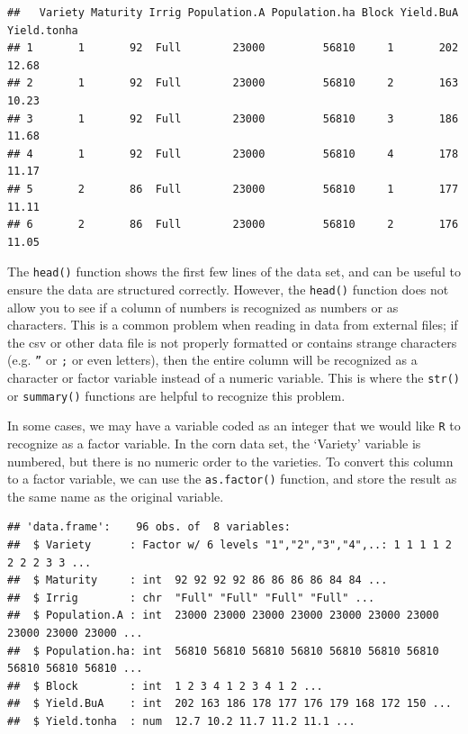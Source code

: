 \documentclass[letterpaper,]{book}
\newenvironment{Shaded}{\begin{snugshade}}{\end{snugshade}}
\newcommand{\KeywordTok}[1]{\textcolor[rgb]{0.13,0.29,0.53}{\textbf{#1}}}
\newcommand{\NormalTok}[1]{#1}
\newcommand{\OperatorTok}[1]{\textcolor[rgb]{0.81,0.36,0.00}{\textbf{#1}}}
\newcommand{\StringTok}[1]{\textcolor[rgb]{0.31,0.60,0.02}{#1}}
\begin{document}
\begin{verbatim}
##   Variety Maturity Irrig Population.A Population.ha Block Yield.BuA Yield.tonha
## 1       1       92  Full        23000         56810     1       202       12.68
## 2       1       92  Full        23000         56810     2       163       10.23
## 3       1       92  Full        23000         56810     3       186       11.68
## 4       1       92  Full        23000         56810     4       178       11.17
## 5       2       86  Full        23000         56810     1       177       11.11
## 6       2       86  Full        23000         56810     2       176       11.05
\end{verbatim}

The \texttt{head()} function shows the first few lines of the data set, and can be useful to ensure the data are structured correctly. However, the \texttt{head()} function does not allow you to see if a column of numbers is recognized as numbers or as characters. This is a common problem when reading in data from external files; if the csv or other data file is not properly formatted or contains strange characters (e.g. \texttt{”} or \texttt{;} or even letters), then the entire column will be recognized as a character or factor variable instead of a numeric variable. This is where the \texttt{str()} or \texttt{summary()} functions are helpful to recognize this problem.

In some cases, we may have a variable coded as an integer that we would like \texttt{R} to recognize as a factor variable. In the corn data set, the `Variety' variable is numbered, but there is no numeric order to the varieties. To convert this column to a factor variable, we can use the \texttt{as.factor()} function, and store the result as the same name as the original variable.

\begin{Shaded}
\end{Shaded}

\begin{verbatim}
## 'data.frame':    96 obs. of  8 variables:
##  $ Variety      : Factor w/ 6 levels "1","2","3","4",..: 1 1 1 1 2 2 2 2 3 3 ...
##  $ Maturity     : int  92 92 92 92 86 86 86 86 84 84 ...
##  $ Irrig        : chr  "Full" "Full" "Full" "Full" ...
##  $ Population.A : int  23000 23000 23000 23000 23000 23000 23000 23000 23000 23000 ...
##  $ Population.ha: int  56810 56810 56810 56810 56810 56810 56810 56810 56810 56810 ...
##  $ Block        : int  1 2 3 4 1 2 3 4 1 2 ...
##  $ Yield.BuA    : int  202 163 186 178 177 176 179 168 172 150 ...
##  $ Yield.tonha  : num  12.7 10.2 11.7 11.2 11.1 ...
\end{verbatim}
\end{document}
